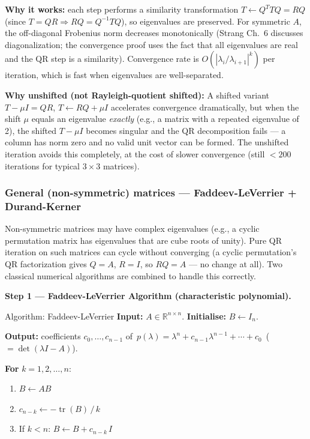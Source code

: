 \documentclass[12pt, a4paper]{article}
\newcommand{\R}{\mathbb{R}}
\newcommand{\trace}{\operatorname{tr}}
\begin{document}
\textbf{Why it works:} each step performs a similarity transformation
$T \leftarrow Q^T T Q = RQ$ (since $T = QR \Rightarrow RQ = Q^{-1}TQ$), so
eigenvalues are preserved.  For symmetric $A$, the off-diagonal Frobenius
norm decreases monotonically (Strang Ch.\ 6 discusses diagonalization;
the convergence proof uses the fact that all eigenvalues are real and the QR
step is a similarity). Convergence rate is $O(|\lambda_i/\lambda_{i+1}|^k)$
per iteration, which is fast when eigenvalues are well-separated.

\textbf{Why unshifted (not Rayleigh-quotient shifted):}  A shifted variant
$T - \mu I = QR$, $T \leftarrow RQ + \mu I$ accelerates convergence
dramatically, but when the shift $\mu$ equals an eigenvalue \emph{exactly}
(e.g., a matrix with a repeated eigenvalue of 2), the shifted $T - \mu I$
becomes singular and the QR decomposition fails — a column has norm zero and
no valid unit vector can be formed. The unshifted iteration avoids this
completely, at the cost of slower convergence (still $< 200$ iterations for
typical $3 \times 3$ matrices).

\subsubsection{General (non-symmetric) matrices — Faddeev-LeVerrier + Durand-Kerner}

Non-symmetric matrices may have complex eigenvalues (e.g., a cyclic
permutation matrix has eigenvalues that are cube roots of unity).  Pure QR
iteration on such matrices can cycle without converging (a cyclic permutation's
QR factorization gives $Q = A$, $R = I$, so $RQ = A$ — no change at all).
Two classical numerical algorithms are combined to handle this correctly.

\medskip\noindent\textbf{Step 1 --- Faddeev-LeVerrier Algorithm (characteristic polynomial).}\par\medskip\noindent
\begin{algobox}{Algorithm: Faddeev-LeVerrier}
\textbf{Input:} $A \in \R^{n\times n}$.
\quad\textbf{Initialise:} $B \leftarrow I_n$.

\noindent\textbf{Output:} coefficients $c_0,\ldots,c_{n-1}$ of
\,$p(\lambda) = \lambda^n + c_{n-1}\lambda^{n-1} + \cdots + c_0\,$
($= \det(\lambda I - A)$).

\medskip
\noindent\textbf{For} $k = 1, 2, \ldots, n$:
\begin{enumerate}[leftmargin=*, noitemsep]
  \item $B \leftarrow AB$
  \item $c_{n-k} \leftarrow -\trace(B)\,/\,k$
  \item If $k < n$: $B \leftarrow B + c_{n-k}\,I$
\end{enumerate}
\end{algobox}
\end{document}
